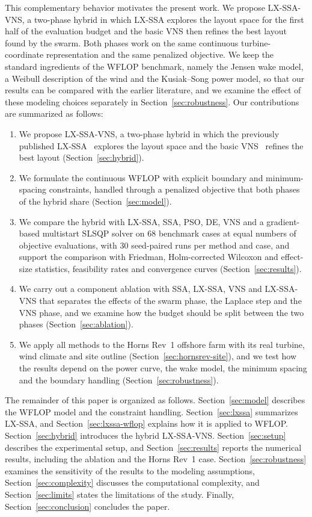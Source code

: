 \documentclass[journal,twoside]{IEEEtran}
\begin{document}
This complementary behavior motivates the present work. We propose LX-SSA-VNS, a two-phase hybrid in which LX-SSA explores the layout space for the first half of the evaluation budget and the basic VNS then refines the best layout found by the swarm. Both phases work on the same continuous turbine-coordinate representation and the same penalized objective. We keep the standard ingredients of the WFLOP benchmark, namely the Jensen wake model, a Weibull description of the wind and the Kusiak--Song power model, so that our results can be compared with the earlier literature, and we examine the effect of these modeling choices separately in Section~\ref{sec:robustness}. Our contributions are summarized as follows:
\begin{enumerate}
\item We propose LX-SSA-VNS, a two-phase hybrid in which the previously published LX-SSA~\cite{Solanki2023} explores the layout space and the basic VNS~\cite{Mladenovic1997,Mladenovic2008} refines the best layout (Section~\ref{sec:hybrid}).
\item We formulate the continuous WFLOP with explicit boundary and minimum-spacing constraints, handled through a penalized objective that both phases of the hybrid share (Section~\ref{sec:model}).
\item We compare the hybrid with LX-SSA, SSA, PSO, DE, VNS and a gradient-based multistart SLSQP solver on 68 benchmark cases at equal numbers of objective evaluations, with 30 seed-paired runs per method and case, and support the comparison with Friedman, Holm-corrected Wilcoxon and effect-size statistics, feasibility rates and convergence curves (Section~\ref{sec:results}).
\item We carry out a component ablation with SSA, LX-SSA, VNS and LX-SSA-VNS that separates the effects of the swarm phase, the Laplace step and the VNS phase, and we examine how the budget should be split between the two phases (Section~\ref{sec:ablation}).
\item We apply all methods to the Horns Rev~1 offshore farm with its real turbine, wind climate and site outline (Section~\ref{sec:hornsrev-site}), and we test how the results depend on the power curve, the wake model, the minimum spacing and the boundary handling (Section~\ref{sec:robustness}).
\end{enumerate}

The remainder of this paper is organized as follows. Section~\ref{sec:model} describes the WFLOP model and the constraint handling. Section~\ref{sec:lxssa} summarizes LX-SSA, and Section~\ref{sec:lxssa-wflop} explains how it is applied to WFLOP. Section~\ref{sec:hybrid} introduces the hybrid LX-SSA-VNS. Section~\ref{sec:setup} describes the experimental setup, and Section~\ref{sec:results} reports the numerical results, including the ablation and the Horns Rev~1 case. Section~\ref{sec:robustness} examines the sensitivity of the results to the modeling assumptions, Section~\ref{sec:complexity} discusses the computational complexity, and Section~\ref{sec:limits} states the limitations of the study. Finally, Section~\ref{sec:conclusion} concludes the paper.
\end{document}
